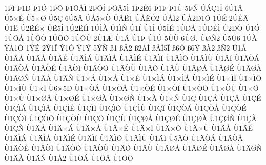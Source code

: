{1^^de^^cf
^^de1^^d0
^^de1^^d3
1^^de^^d4
^^de1^^d4^^c5^^cc
2^^de^^d4^^cd
^^de^^d5^^c45^^cc
1^^de2^^c86
^^de1^^de
^^de1^^db
5^^de^^d1
^^db^^c1^^c71^^ce
6^^db1^^c2
^^db5^^d7^^c9
^^db5^^d7^^d8
^^db5^^c7
6^^db5^^c4
^^db^^c55^^d7^^d2
^^db^^c5^^cb1
^^db^^c5^^cb^^d32
^^db^^c5^^cf2
^^db^^c52^^d01^^d4
1^^db^^c9
2^^db^^c9^^c2
^^db1^^cb
^^db2^^cb^^c9^^d7
^^db^^cb5^^ce
1^^db2^^cb^^cf^^cc
1^^db^^cc^^c0
^^db1^^cc^^d1
^^db1^^cd
^^db1^^ce
^^db5^^ce^^c9
1^^db^^d0^^c5
1^^db^^d0^^c9^^cc
^^db2^^d0^^d2
^^db1^^d3
1^^db^^d4^^c5
1^^db^^d4^^d2
1^^db^^d4^^d5
1^^db^^d4^^d9
2^^db1^^c6
^^db1^^c3
^^db1^^de
^^db1^^db
5^^db^^d9
6^^db^^d8.
^^db^^d8^^d12
^^db5^^dc6
1^^db^^c0
^^dd^^c51^^d3
1^^dd^^c9
2^^dd1^^ce
^^dd1^^d3
^^dd1^^dd
5^^dd^^d1
^^df1
^^df^^c52
^^df2^^c5^^cc
^^df^^c5^^cd5^^ce
^^df6^^d3
^^df6^^dd
^^df^^c02
^^df^^d12
^^d91^^c1
^^d91^^c2^^c1
^^d91^^c2^^c5
^^d91^^c2^^c9
^^d91^^c2^^cc^^c1
^^d91^^c2^^cc^^c5
^^d91^^c2^^cc^^c9
^^d91^^c2^^cc^^cf
^^d91^^c2^^cc^^d5
^^d91^^c2^^cc^^d9
^^d91^^c2^^cf
^^d91^^c2^^d2^^c1
^^d91^^c2^^d2^^c5
^^d91^^c2^^d2^^c9
^^d91^^c2^^d2^^cf
^^d91^^c2^^d2^^d5
^^d91^^c2^^d2^^d9
^^d91^^c2^^d5
^^d91^^c2^^d9
^^d91^^c2^^d8^^c5
^^d91^^c2^^d8^^c9
^^d91^^c2^^d8^^c0
^^d91^^c2^^d8^^d1
^^d91^^c2^^c0
^^d91^^c2^^d1
^^d91^^d7^^c1
^^d91^^d7^^c5
^^d91^^d7^^c9
^^d91^^d7^^cc^^c1
^^d91^^d7^^cc^^c5
^^d91^^d7^^cc^^c9
^^d91^^d7^^cc^^cf
^^d91^^d7^^cc^^d5
^^d91^^d7^^cc^^d9
^^d91^^d7^^cf
^^d96^^d75^^d0
^^d91^^d7^^d2^^c1
^^d91^^d7^^d2^^c5
^^d91^^d7^^d2^^c9
^^d91^^d7^^d2^^cf
^^d91^^d7^^d2^^d5
^^d91^^d7^^d2^^d9
^^d91^^d7^^d5
^^d91^^d7^^d9
^^d91^^d7^^d8^^c5
^^d91^^d7^^d8^^c9
^^d91^^d7^^d8^^c0
^^d91^^d7^^d8^^d1
^^d91^^d7^^c0
^^d91^^d7^^d1
^^d91^^c7
^^d91^^c7^^c1
^^d91^^c7^^c5
^^d91^^c7^^c9
^^d91^^c7^^cc^^c1
^^d91^^c7^^cc^^c5
^^d91^^c7^^cc^^c9
^^d91^^c7^^cc^^cf
^^d91^^c7^^cc^^d5
^^d91^^c7^^cc^^d9
^^d91^^c7^^cf
^^d91^^c7^^d2^^c1
^^d91^^c7^^d2^^c5
^^d91^^c7^^d2^^c9
^^d91^^c7^^d2^^cf
^^d91^^c7^^d2^^d5
^^d91^^c7^^d2^^d9
^^d91^^c7^^d5
^^d91^^c7^^d9
^^d91^^c7^^d8^^c5
^^d91^^c7^^d8^^c9
^^d91^^c7^^d8^^c0
^^d91^^c7^^d8^^d1
^^d91^^c7^^c0
^^d91^^c7^^d1
^^d91^^c4^^c1
^^d91^^c4^^d7^^c1
^^d91^^c4^^d7^^c5
^^d91^^c4^^d7^^c9
^^d91^^c4^^d7^^cf
^^d91^^c4^^d7^^d5
^^d91^^c4^^d7^^d9
^^d91^^c4^^c5
^^d91^^c4^^c9
^^d91^^c4^^cc^^c1
^^d91^^c4^^cc^^c5
^^d91^^c4^^cc^^c9
^^d91^^c4^^cc^^cf
^^d91^^c4^^cc^^d5
^^d91^^c4^^cc^^d9
^^d91^^c4^^cf
^^d95^^c4^^d2
^^d91^^c4^^d2^^c1
^^d91^^c4^^d2^^c5
^^d91^^c4^^d2^^c9
^^d91^^c4^^d2^^cf
^^d91^^c4^^d2^^d5
^^d91^^c4^^d2^^d9
^^d91^^c4^^d5
^^d91^^c4^^d9
^^d91^^c4^^d8^^c5
^^d91^^c4^^d8^^c9
^^d91^^c4^^d8^^c0
^^d91^^c4^^d8^^d1
^^d91^^c4^^c0
^^d91^^c4^^d1
^^d91^^c52
^^d91^^d6^^c1
^^d91^^d6^^c5
^^d91^^d6^^d6
}
